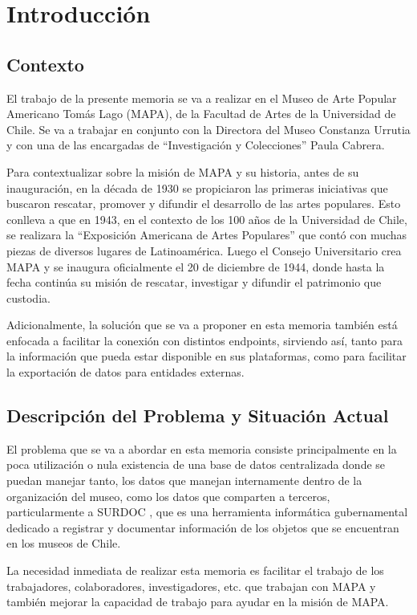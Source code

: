 \chapter{Introducción}

\section{Contexto}

El trabajo de la presente memoria se va a realizar en el Museo de Arte Popular Americano Tomás Lago (MAPA), de la Facultad de Artes de la Universidad de Chile. Se va a trabajar en conjunto con la Directora
del Museo Constanza Urrutia y con una de las encargadas de ``Investigación y Colecciones'' Paula Cabrera.

Para contextualizar sobre la misión de MAPA y su historia, antes de su inauguración, en la década de 1930 se propiciaron las primeras iniciativas que buscaron rescatar, promover y difundir el desarrollo de las artes populares. Esto conlleva a que en 1943, en el contexto de los 100 años de la Universidad de Chile, se realizara la “Exposición Americana de Artes Populares” que contó con muchas piezas de diversos lugares de Latinoamérica. Luego el Consejo Universitario crea MAPA y se inaugura oficialmente el 20 de diciembre de 1944, donde hasta la fecha continúa su misión de rescatar, investigar y difundir el patrimonio que custodia.

Adicionalmente, la solución que se va a proponer en esta memoria también está enfocada a facilitar la conexión con distintos endpoints, sirviendo así, tanto para la información que pueda estar disponible en sus plataformas, como para facilitar la exportación de datos para entidades externas.

\section{Descripción del Problema y Situación Actual}

El problema que se va a abordar en esta memoria consiste principalmente en la poca utilización o nula existencia de una base de datos centralizada donde se puedan manejar tanto, los datos que manejan internamente dentro de la organización del museo, como los datos que comparten a terceros, particularmente a SURDOC \cite{surdoc}, que es una herramienta informática gubernamental dedicado a registrar y documentar información de los objetos que se encuentran en los museos de Chile.

La necesidad inmediata de realizar esta memoria es facilitar el trabajo de los trabajadores, colaboradores, investigadores, etc. que trabajan con MAPA y también mejorar la capacidad de trabajo para ayudar en la misión de MAPA.

